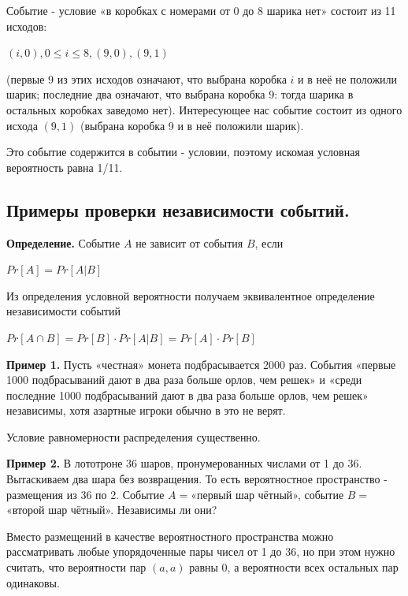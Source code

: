 \documentclass[a4paper, 10pt]{article}
\begin{document}
Событие - условие «в коробках с номерами от 0 до 8 шарика нет» состоит из 11 исходов:

\begin{center}
    $\displaystyle (i, 0), 0 \leqslant i \leqslant 8, (9, 0), (9, 1)$
\end{center}

(первые 9 из этих исходов означают, что выбрана коробка $i$ и в неё не положили шарик; последние два означают, что выбрана коробка 9: тогда шарика в остальных коробках заведомо нет). Интересующее нас событие состоит из одного исхода $(9, 1)$ (выбрана коробка 9 и в неё положили шарик).

Это событие содержится в событии - условии, поэтому искомая условная вероятность равна 1/11.

\subsection{Примеры проверки независимости событий.}

\textbf{Определение.} Событие $A$ не зависит от события $B$, если

\begin{center}
    $\displaystyle Pr[A] = Pr[A | B]$
\end{center}

Из определения условной вероятности получаем эквивалентное определение независимости событий

\begin{center}
    $\displaystyle Pr[A \cap B] = Pr[B] \cdot Pr[A | B] = Pr[A] \cdot Pr[B]$
\end{center}

\textbf{Пример 1.} Пусть «честная» монета подбрасывается 2000 раз. События «первые 1000 подбрасываний дают в два раза больше орлов, чем решек» и «среди последние 1000 подбрасываний дают в два раза больше орлов, чем решек» независимы, хотя азартные игроки обычно в это не верят.

Условие равномерности распределения существенно.

\medskip

\textbf{Пример 2.} В лототроне 36 шаров, пронумерованных числами от 1 до 36. Вытаскиваем два шара без возвращения. То есть вероятностное пространство - размещения из 36 по 2. Событие $A =$«первый шар чётный», событие $B =$«второй шар чётный». Независимы ли они?

Вместо размещений в качестве вероятностного пространства можно рассматривать любые упорядоченные пары чисел от 1 до 36, но при этом нужно считать, что вероятности пар $(a, a)$ равны 0, а вероятности всех остальных пар одинаковы.
\end{document}
